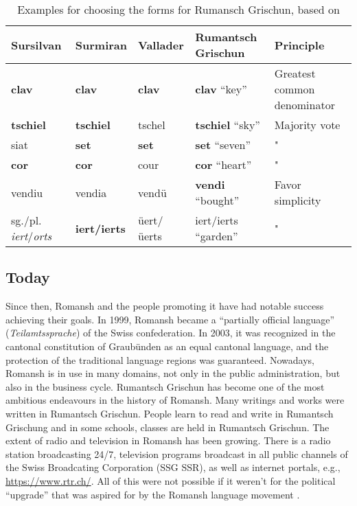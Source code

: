 \begin{table}
\centering
\begin{tabular}{lllll}
\toprule
Sursilvan & Surmiran & Vallader & Rumantsch Grischun & Principle \\
\midrule
\textbf{clav}	  &  \textbf{clav}    &  \textbf{clav}    & \textbf{clav}  \enquote{key}  & Greatest common denominator \\
\textbf{tschiel}       &   \textbf{tschiel}   & tschel      & \textbf{tschiel} \enquote{sky} & Majority vote \\
siat 	 & \textbf{set}      & \textbf{set}      & \textbf{set} \enquote{seven} & " \\
\textbf{cor} & \textbf{cor} & cour & \textbf{cor} \enquote{heart} & " \\
vendiu & vendia & vendü & \textbf{vendi} \enquote{bought} & Favor simplicity \\
sg./pl. \emph{iert}/\emph{orts} & \textbf{iert/ierts} & üert/üerts & iert/ierts \enquote{garden} & " \\
\bottomrule

\end{tabular}
\caption{Examples for choosing the forms for Rumansch Grischun, based on \cite[70-71]{liver1999}}
\label{tab:rg-examples}
\end{table}


\subsection{Today}
Since then, Romansh and the people promoting it have had notable success achieving their goals. 
In 1999, Romansh became a \enquote{partially official language} (\emph{Teilamtssprache}) of the Swiss confederation. 
In 2003, it was recognized in the cantonal constitution of Graubünden as an equal cantonal language, and the protection of the traditional language regions was guaranteed.
Nowadays, Romansh is in use in many domains, not only in the public administration, but also in the business cycle. 
Rumantsch Grischun has become one of the most ambitious endeavours in the history of Romansh. 
Many writings and works were written in Rumantsch Grischun. 
People learn to read and write in Rumantsch Grischung and in some schools, classes are held in Rumantsch Grischun. 
The extent of radio and television in Romansh has been growing. 
There is a radio station broadcasting 24/7, television programs broadcast in all public channels of the Swiss Broadcating Corporation (SSG SSR), as well as  internet portals, e.g., \url{https://www.rtr.ch/}. All of this were not possible if it weren't for the political \enquote{upgrade} that was aspired for by the Romansh language movement \autocite{cathomas2012}.






